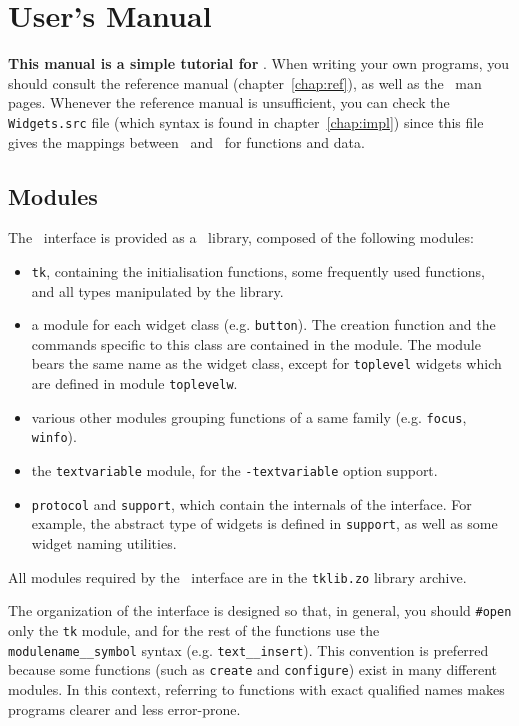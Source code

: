 \chapter{User's Manual}
{\bf This manual is a simple tutorial for \camltk }.  When writing your own
programs, you should consult the reference manual
(chapter~\ref{chap:ref}), as well as the \tk\ man pages.  Whenever the
reference manual is unsufficient, you can check the \verb|Widgets.src| file
(which syntax is found in chapter~\ref{chap:impl}) since this file gives the
mappings between \tk\ and \caml\ for functions and data. 

\section{Modules}
The \camltk\ interface is provided as a \caml\ library, composed of the
following modules:

\begin{itemize}
\item \verb|tk|, containing the initialisation functions, some frequently
used functions, and all types manipulated by the library.

\item a module for each widget class (e.g. \verb|button|). The creation
function and the commands specific to this class are contained in the
module. The module bears the same name as the widget class, except for
\verb|toplevel| widgets which are defined in module \verb|toplevelw|.

\item various other modules grouping functions of a same family
(e.g. \verb|focus|, \verb|winfo|). 

\item the \verb|textvariable| module, for the \verb|-textvariable| option
support. 

\item \verb|protocol| and \verb|support|, which contain the internals
of the interface. For example, the abstract type of widgets is defined in
\verb|support|, as well as some widget naming utilities.
\end{itemize} 

All modules required by the \camltk\ interface are in the \verb|tklib.zo|
library archive.

The organization of the interface is designed so that, in general, you
should \verb|#open| only the \verb|tk| module, and for the 
rest of the functions use the \verb|modulename__symbol| syntax (e.g.
\verb|text__insert|).
This convention is preferred because some functions (such as \verb|create|
and \verb|configure|) exist in many different modules. In this context,
referring to functions with exact qualified names makes programs clearer and
less error-prone.


